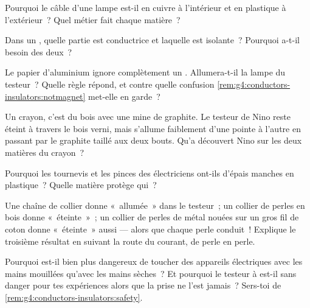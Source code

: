 \begin{exercise}[$\star$]\label{exo:g4:conductors-insulators:5}
Pourquoi le câble d'une lampe est-il en cuivre à l'intérieur et en
plastique à l'extérieur~? Quel métier fait chaque matière~?
\end{exercise}

\begin{exercise}[$\star$]\label{exo:g4:conductors-insulators:6}
Dans un , quelle partie est conductrice et laquelle est
isolante~? Pourquoi a-t-il besoin des deux~?
\end{exercise}

\begin{exercise}[$\star$]\label{exo:g4:conductors-insulators:7}
Le papier d'aluminium ignore complètement un . Allumera-t-il la
lampe du testeur~? Quelle règle répond, et contre quelle confusion
\cref{rem:g4:conductors-insulators:notmagnet} met-elle en garde~?
\end{exercise}

\begin{exercise}[$\star$]\label{exo:g4:conductors-insulators:8}
Un crayon, c'est du bois avec une mine de graphite. Le testeur de
Nino reste éteint à travers le bois verni, mais s'allume faiblement
d'une pointe à l'autre en passant par le graphite taillé aux deux
bouts. Qu'a découvert Nino sur les deux matières du crayon~?
\end{exercise}

\begin{exercise}[$\star$]\label{exo:g4:conductors-insulators:9}
Pourquoi les tournevis et les pinces des électriciens ont-ils
d'épais manches en plastique~? Quelle matière protège qui~?
\end{exercise}

\begin{exercise}[$\star\star$]\label{exo:g4:conductors-insulators:10}
Une chaîne de collier donne «~allumée~» dans le testeur~; un collier
de perles en bois donne «~éteinte~»~; un collier de perles de métal
nouées sur un gros fil de coton donne «~éteinte~» aussi --- alors que
chaque perle conduit~! Explique le troisième résultat en suivant la
route du courant, de perle en perle.
\end{exercise}

\begin{exercise}[$\star\star$]\label{exo:g4:conductors-insulators:11}
Pourquoi est-il bien plus dangereux de toucher des appareils
électriques avec les mains mouillées qu'avec les mains sèches~? Et
pourquoi le testeur à  est-il sans danger pour tes expériences
alors que la prise ne l'est jamais~? Sers-toi de
\cref{rem:g4:conductors-insulators:safety}.
\end{exercise}
